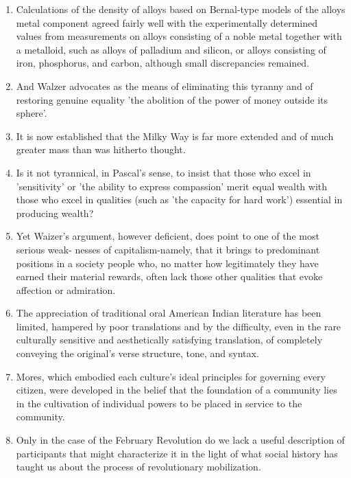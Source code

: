 \begin{enumerate}
\item Calculations of the density of alloys based on Bernal-type models of the alloys metal component agreed fairly well with the experimentally determined values from measurements on alloys consisting of a noble metal together with a metalloid, such as alloys of palladium and silicon,  or alloys consisting of iron, phosphorus, and carbon, although small discrepancies remained. 

\item And Walzer advocates as the means of eliminating this tyranny and of restoring genuine equality 'the abolition of the power of money outside its sphere'.

\item It is now established that the Milky Way is far more extended and of much greater mass than was hitherto thought.  

\item Is it not tyrannical, in Pascal's sense, to insist that those who excel in
'sensitivity' or 'the ability to express compassion' merit equal wealth with those who excel in qualities (such as 'the capacity for hard work') essential in producing wealth?   

\item Yet Waizer's argument, however deficient, does point to one of the most serious weak-  nesses of capitalism-namely, that it brings to predominant positions in a society people who, no matter how legitimately they have earned their material rewards, often lack those  other qualities that evoke affection or admiration. 

\item The appreciation of traditional oral American Indian literature has been limited, hampered by poor translations and by the difficulty, even in the rare culturally sensitive and aesthetically  satisfying translation, of completely conveying the original's verse structure, tone, and syntax.

\item Mores,  which embodied each culture's ideal principles for governing every citizen,  were developed in the belief that the foundation of a community lies in the cultivation of individual powers to be placed in service to the community. 

\item Only in the case of the February Revolution do we lack a useful description of participants  that might characterize it in the light of what social history has taught us about the process of revolutionary mobilization. 


\end{enumerate}
